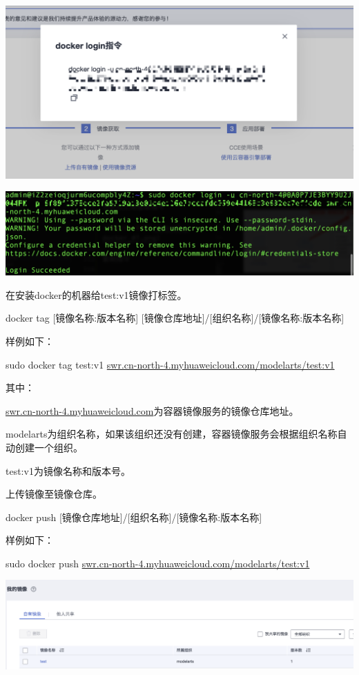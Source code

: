 \documentclass[fontset=windows,openany,UTF8]{ctexbook}
\begin{document}
\includegraphics[scale=0.6]{./assets/docker_08.png}  

\includegraphics[scale=0.3]{./assets/docker_09.png}  

在安装docker的机器给test:v1镜像打标签。

docker tag [镜像名称:版本名称] [镜像仓库地址]/[组织名称]/[镜像名称:版本名称]

样例如下：

sudo docker tag test:v1 \url{swr.cn-north-4.myhuaweicloud.com/modelarts/test:v1}

其中：

\url{swr.cn-north-4.myhuaweicloud.com}为容器镜像服务的镜像仓库地址。

modelarts为组织名称，如果该组织还没有创建，容器镜像服务会根据组织名称自动创建一个组织。

test:v1为镜像名称和版本号。

上传镜像至镜像仓库。

docker push [镜像仓库地址]/[组织名称]/[镜像名称:版本名称]

样例如下：

sudo docker push \url{swr.cn-north-4.myhuaweicloud.com/modelarts/test:v1}

\includegraphics[scale=0.5]{./assets/docker_11.png}  
\end{document}
